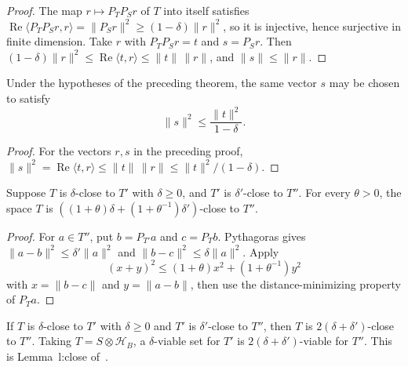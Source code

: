 \begin{proof}
    \leanok
    The map $r\mapsto P_TP_Sr$ of $T$ into itself satisfies
    $\operatorname{Re}\langle P_TP_Sr,r\rangle=\lVert P_Sr\rVert^2
        \ge(1-\delta)\lVert r\rVert^2$, so it is injective, hence surjective in
    finite dimension. Take $r$ with $P_TP_Sr=t$ and $s=P_Sr$. Then
    $(1-\delta)\lVert r\rVert^2\le\operatorname{Re}\langle t,r\rangle
        \le\lVert t\rVert\,\lVert r\rVert$, and $\lVert s\rVert\le\lVert r\rVert$.
\end{proof}

\begin{lemma}
    \label{lem:subspace_close_preimage_squared}
    \leanok
    Under the hypotheses of the preceding theorem, the same vector $s$ may be
    chosen to satisfy
    \[
        \lVert s\rVert^2\le \frac{\lVert t\rVert^2}{1-\delta}.
    \]
\end{lemma}

\begin{proof}
    \leanok
    For the vectors $r,s$ in the preceding proof,
    $\lVert s\rVert^2=\operatorname{Re}\langle t,r\rangle
        \le\lVert t\rVert\,\lVert r\rVert
        \le\lVert t\rVert^2/(1-\delta)$.
\end{proof}

\begin{lemma}
    \label{lem:subspace_close_trans_weighted}
    \leanok
    Suppose $T$ is $\delta$-close to $T'$ with $\delta\ge0$, and $T'$ is
    $\delta'$-close to $T''$. For every $\theta>0$, the space $T$ is
    $((1+\theta)\delta+(1+\theta^{-1})\delta')$-close to $T''$.
\end{lemma}

\begin{proof}
    \leanok
    For $a\in T''$, put $b=P_{T'}a$ and $c=P_Tb$. Pythagoras gives
    $\lVert a-b\rVert^2\le\delta'\lVert a\rVert^2$ and
    $\lVert b-c\rVert^2\le\delta\lVert a\rVert^2$. Apply
    \[
        (x+y)^2\le(1+\theta)x^2+(1+\theta^{-1})y^2
    \]
    with $x=\lVert b-c\rVert$ and $y=\lVert a-b\rVert$, then use the
    distance-minimizing property of $P_Ta$.
\end{proof}

\begin{theorem}[Robustness]
    \label{thm:subspace_close_trans}
    \leanok
    If $T$ is $\delta$-close to $T'$ with $\delta\ge0$ and $T'$ is
    $\delta'$-close to $T''$, then $T$ is $2(\delta+\delta')$-close to $T''$.
    Taking $T=S\otimes\mathcal H_B$, a $\delta$-viable set for $T'$ is
    $2(\delta+\delta')$-viable for $T''$. This is Lemma~l:close
    of~\cite[lines 484--489]{Arad2016RigorousRG}.
\end{theorem}

